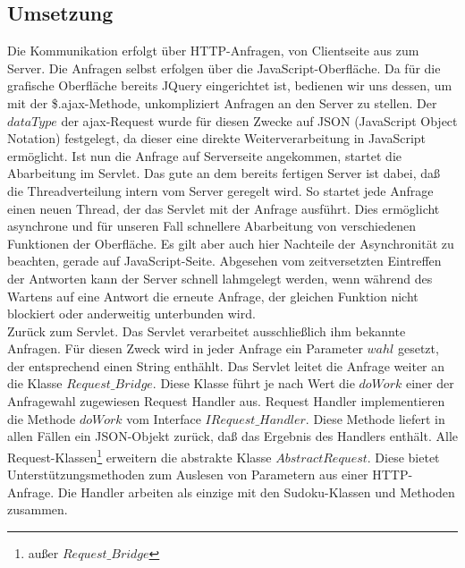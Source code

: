 \documentclass[a4paper,12pt]{scrreprt}
\begin{document}
	\subsection{Umsetzung}
	Die Kommunikation erfolgt \"uber HTTP-Anfragen, von Clientseite aus zum Server.
	Die Anfragen selbst erfolgen \"uber die JavaScript-Oberfl\"ache. Da  f\"ur die grafische Oberfl\"ache
	bereits JQuery eingerichtet ist, bedienen wir uns dessen, um mit der \$.ajax-Methode, unkompliziert
	Anfragen an den Server zu stellen. Der $dataType$ der ajax-Request wurde f\"ur diesen Zwecke auf
	JSON (JavaScript Object Notation) festgelegt, da dieser eine direkte Weiterverarbeitung in JavaScript
	erm\"oglicht. Ist nun die Anfrage auf Serverseite angekommen, startet  die Abarbeitung im Servlet.
	Das gute an dem bereits fertigen Server ist dabei, da{\ss} die Threadverteilung intern vom Server
	geregelt wird. So startet jede Anfrage einen neuen Thread, der das Servlet mit der Anfrage ausführt.
	Dies erm\"oglicht asynchrone und f\"ur unseren Fall schnellere Abarbeitung von verschiedenen Funktionen
	der Oberfl\"ache. Es gilt aber auch hier Nachteile der Asynchronit\"at zu beachten, gerade auf
	JavaScript-Seite. Abgesehen vom zeitversetzten Eintreffen der Antworten kann der Server schnell
	lahmgelegt werden, wenn w\"ahrend des Wartens auf eine Antwort die erneute Anfrage, der gleichen
	Funktion nicht blockiert oder anderweitig unterbunden wird.\medskip \\
	Zurück zum Servlet. Das Servlet verarbeitet ausschließlich ihm bekannte Anfragen. F\"ur diesen
	Zweck wird in jeder Anfrage ein Parameter $wahl$ gesetzt, der entsprechend einen String enth\"ahlt.
	Das Servlet leitet die Anfrage weiter an die Klasse $Request\_Bridge$. Diese Klasse f\"uhrt je nach
	Wert die $doWork$ einer der Anfragewahl zugewiesen Request Handler aus. Request Handler
	implementieren die Methode $doWork$ vom Interface $IRequest\_Handler$. Diese Methode liefert in
	allen F\"allen ein JSON-Objekt zur\"uck, da{\ss} das Ergebnis des Handlers enth\"alt. Alle
	Request-Klassen\footnote{au{\ss}er $Request\_Bridge$} erweitern die abstrakte Klasse $AbstractRequest$.
	Diese bietet Unterst\"utzungsmethoden zum Auslesen von Parametern aus einer HTTP-Anfrage.
	Die Handler arbeiten als einzige mit den Sudoku-Klassen und Methoden zusammen.
\end{document}
